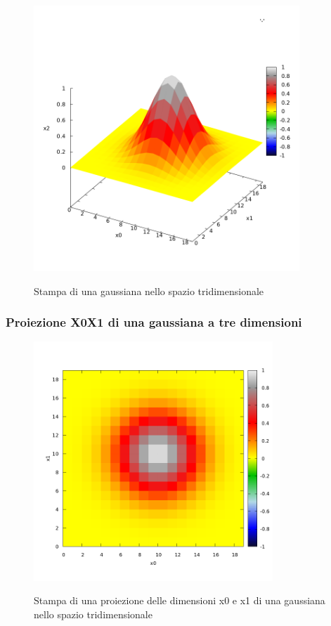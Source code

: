 \documentclass{article}
\begin{document}
\begin{figure}[H] 
\begin{center}  
  \includegraphics[width=10cm]{test-gnuplot-Gauss3D.png}\\ 
  \caption{Stampa di una gaussiana nello spazio tridimensionale} 
\end{center} 
\end{figure}

\subsubsection{Proiezione X0X1 di una gaussiana a tre dimensioni}

\begin{figure}[H] 
\begin{center}  
  \includegraphics[width=9cm]{test-gnuplot-Gauss3DProjXY.png}\\ 
  \caption{Stampa di una proiezione delle dimensioni x0 e x1 di una gaussiana nello spazio tridimensionale} 
\end{center} 
\end{figure}
\end{document}
